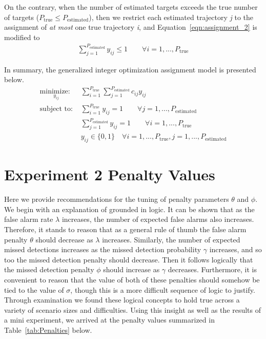 \documentclass[journal]{IEEEtran}
\begin{document}
On the contrary, when the number of estimated targets exceeds the true number of targets ($P_{\text{true}}\leq P_{\text{estimated}}$), then we restrict each estimated trajectory \textit{j} to the assignment of \textit{at most} one true trajectory \textit{i}, and Equation~\ref{eqn:assignment_2} is modified to
\begin{align}
\sum_{j=1}^{P_{\text{estimated}}} y_{ij} \leq 1 \qquad \forall i = 1,...,P_{\text{true}}
\end{align}

In summary, the generalized integer optimization assignment model is presented below.  
\begin{align*}
\underset{y_{ij}}{\text{minimize: }} & \sum_{i=1}^{P_{\text{true}}} \sum_{j=1}^{P_{\text{estimated}}} c_{ij}y_{ij}\\
\text{subject to: }	& \sum_{i=1}^{P_{\text{true}}} y_{ij} = 1 \qquad \forall j = 1,...,P_{\text{estimated}}\\
				& \sum_{j=1}^{P_{\text{estimated}}} y_{ij} = 1 \qquad \forall i = 1,...,P_{\text{true}}\\
				& y_{ij} \in \{0,1\} \quad \forall i = 1,...,P_{\text{true}},j = 1,...,P_{\text{estimated}}
\end{align*}

\section{Experiment 2 Penalty Values}\label{sec:Penalty_Appendix}
Here we provide recommendations for the tuning of penalty parameters $\theta$ and $\phi$. We begin with an explanation of grounded in logic. It can be shown that as the false alarm rate $\lambda$ increases, the number of expected false alarms also increases. Therefore, it stands to reason that as a general rule of thumb the false alarm penalty $\theta$ should decrease as $\lambda$ increases. Similarly, the number of expected missed detections increases as the missed detection probability $\gamma$ increases, and so too the missed detection penalty should decrease. Then it follows logically that the missed detection penalty $\phi$ should increase as $\gamma$ decreases. Furthermore, it is convenient to reason that the value of both of these penalties should somehow be tied to the value of $\sigma$, though this is a more difficult sequence of logic to justify. Through examination we found these logical concepts to hold true across a variety of scenario sizes and difficulties. Using this insight as well as the results of a mini experiment, we arrived at the penalty values summarized in Table~\ref{tab:Penalties} below. 
\end{document}
